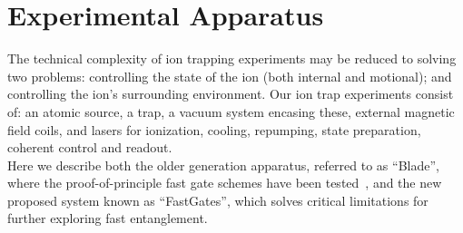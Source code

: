 \documentclass[12pt]{iopart}
\begin{document}


\section{Experimental Apparatus}

The technical complexity of ion trapping experiments may be reduced to
solving two problems: controlling the state of the ion (both internal
and motional); and controlling the ion's surrounding environment.
Our ion trap experiments consist of: an atomic source, a trap, a
vacuum system encasing these, external magnetic field coils, and
lasers for ionization, cooling, repumping, state preparation, coherent
control and readout.\\
Here we describe both the older generation apparatus, referred to as ``Blade'',
where the proof-of-principle fast gate schemes have been tested~\cite{saner_breaking_2023, schafer_fast_2018}, and the new proposed system known as
``FastGates'', which solves critical limitations for further exploring
fast entanglement.
\end{document}
